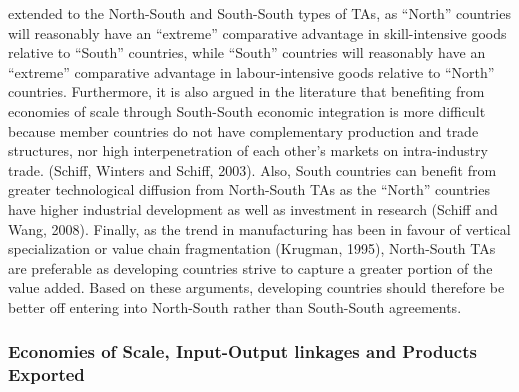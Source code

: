 \documentclass[12pt]{article}%
\begin{document}
extended to the North-South and South-South types of TAs, as ``North''
countries will reasonably have an ``extreme'' comparative advantage in
skill-intensive goods relative to ``South'' countries, while ``South''
countries will reasonably have an ``extreme'' comparative advantage in
labour-intensive goods relative to ``North'' countries. Furthermore, it
is also argued in the literature that benefiting from economies of scale
through South-South economic integration is more difficult because
member countries do not have complementary production and trade
structures, nor high interpenetration of each other's markets on
intra-industry trade. (Schiff, Winters and Schiff, 2003). Also, South
countries can benefit from greater technological diffusion from
North-South TAs as the ``North'' countries have higher industrial
development as well as investment in research (Schiff and Wang, 2008).
Finally, as the trend in manufacturing has been in favour of vertical
specialization or value chain fragmentation (Krugman, 1995), North-South
TAs are preferable as developing countries strive to capture a greater
portion of the value added. Based on these arguments, developing
countries should therefore be better off entering into North-South
rather than South-South agreements.%
\subsubsection{Economies of Scale, Input{-}Output linkages and Products Exported}%
\label{ssubsec:EconomiesofScale,Input{-}OutputlinkagesandProductsExported}%
\end{document}
